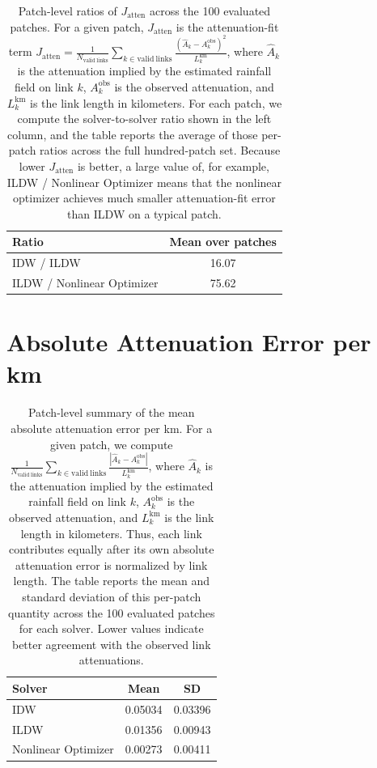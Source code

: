 \documentclass[11pt]{article}
\begin{document}
\begin{table}[H]
  \centering
  \begin{tabular}{lc}
    \toprule
    Ratio & Mean over patches \\
    \midrule
    IDW / ILDW & 16.07 \\
    ILDW / Nonlinear Optimizer & 75.62 \\
    \bottomrule
  \end{tabular}
  \caption{Patch-level ratios of $J_{\mathrm{atten}}$ across the 100 evaluated patches. For a given patch, $J_{\mathrm{atten}}$ is the attenuation-fit term $J_{\mathrm{atten}} = \frac{1}{N_{\mathrm{valid\ links}}}\sum_{k \in \mathrm{valid\ links}} \frac{\left(\hat{A}_k - A_k^{\mathrm{obs}}\right)^2}{L_k^{\mathrm{km}}}$, where $\hat{A}_k$ is the attenuation implied by the estimated rainfall field on link $k$, $A_k^{\mathrm{obs}}$ is the observed attenuation, and $L_k^{\mathrm{km}}$ is the link length in kilometers. For each patch, we compute the solver-to-solver ratio shown in the left column, and the table reports the average of those per-patch ratios across the full hundred-patch set. Because lower $J_{\mathrm{atten}}$ is better, a large value of, for example, ILDW / Nonlinear Optimizer means that the nonlinear optimizer achieves much smaller attenuation-fit error than ILDW on a typical patch.}
\end{table}

\section*{Absolute Attenuation Error per km}
\begin{table}[H]
  \centering
  \begin{tabular}{lcc}
    \toprule
    Solver & Mean & SD \\
    \midrule
    IDW & 0.05034 & 0.03396 \\
    ILDW & 0.01356 & 0.00943 \\
    Nonlinear Optimizer & 0.00273 & 0.00411 \\
    \bottomrule
  \end{tabular}
  \caption{Patch-level summary of the mean absolute attenuation error per km. For a given patch, we compute $\frac{1}{N_{\mathrm{valid\ links}}}\sum_{k \in \mathrm{valid\ links}} \frac{\left|\hat{A}_k - A_k^{\mathrm{obs}}\right|}{L_k^{\mathrm{km}}}$, where $\hat{A}_k$ is the attenuation implied by the estimated rainfall field on link $k$, $A_k^{\mathrm{obs}}$ is the observed attenuation, and $L_k^{\mathrm{km}}$ is the link length in kilometers. Thus, each link contributes equally after its own absolute attenuation error is normalized by link length. The table reports the mean and standard deviation of this per-patch quantity across the 100 evaluated patches for each solver. Lower values indicate better agreement with the observed link attenuations.}
\end{table}
\end{document}
